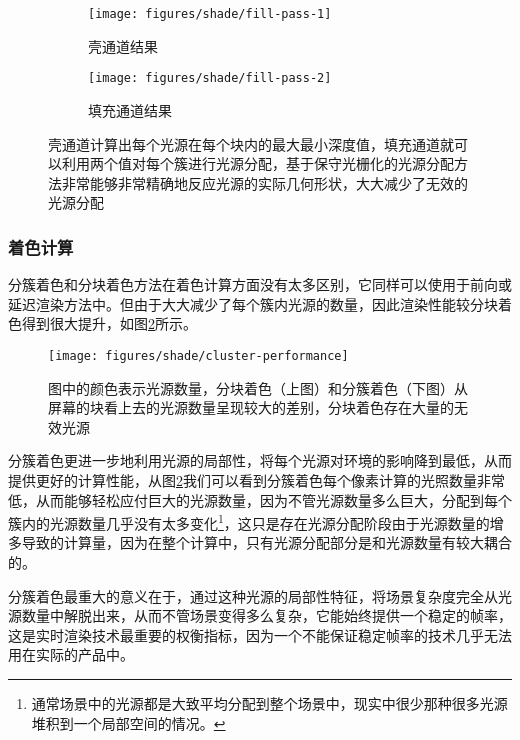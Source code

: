 \begin{figure}
\begin{center}
	\begin{subfigure}[b]{0.49\textwidth}
		\texttt{[image: figures/shade/fill-pass-1]}
		\caption{壳通道结果}
	\end{subfigure}
	\begin{subfigure}[b]{0.49\textwidth}
		\texttt{[image: figures/shade/fill-pass-2]}
		\caption{填充通道结果}
	\end{subfigure}
\end{center}
\caption{壳通道计算出每个光源在每个块内的最大最小深度值，填充通道就可以利用两个值对每个簇进行光源分配，基于保守光栅化的光源分配方法非常能够非常精确地反应光源的实际几何形状，大大减少了无效的光源分配}
\label{f:shade-fill-pass}
\end{figure}





\subsubsection{着色计算}
分簇着色和分块着色方法在着色计算方面没有太多区别，它同样可以使用于前向或延迟渲染方法中。但由于大大减少了每个簇内光源的数量，因此渲染性能较分块着色得到很大提升，如图\ref{f:shade-cluster-performance}所示。

\begin{figure}
	\sidecaption
	\texttt{[image: figures/shade/cluster-performance]}
	\caption{图中的颜色表示光源数量，分块着色（上图）和分簇着色（下图）从屏幕的块看上去的光源数量呈现较大的差别，分块着色存在大量的无效光源}
	\label{f:shade-cluster-performance}
\end{figure}

分簇着色更进一步地利用光源的局部性，将每个光源对环境的影响降到最低，从而提供更好的计算性能，从图\ref{f:shade-cluster-performance}我们可以看到分簇着色每个像素计算的光照数量非常低，从而能够轻松应付巨大的光源数量，因为不管光源数量多么巨大，分配到每个簇内的光源数量几乎没有太多变化\footnote{通常场景中的光源都是大致平均分配到整个场景中，现实中很少那种很多光源堆积到一个局部空间的情况。}，这只是存在光源分配阶段由于光源数量的增多导致的计算量，因为在整个计算中，只有光源分配部分是和光源数量有较大耦合的。

分簇着色最重大的意义在于，通过这种光源的局部性特征，将场景复杂度完全从光源数量中解脱出来，从而不管场景变得多么复杂，它能始终提供一个稳定的帧率，这是实时渲染技术最重要的权衡指标，因为一个不能保证稳定帧率的技术几乎无法用在实际的产品中。





